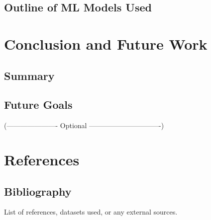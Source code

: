 \documentclass[review,onefignum,onetabnum,twoside]{siamart220329}
\begin{document}
\subsection{Outline of ML Models Used}
\label{subsec:ML_models}


\section{Conclusion and Future Work}
\label{sec:conclusion}

\subsection{Summary}
\label{subsec:summary}

\subsection{Future Goals}
\label{subsec:future}


(---------------------- Optional -------------------------------)
\section{References}
\subsection{Bibliography}
List of references, datasets used, or any external sources.
\end{document}
